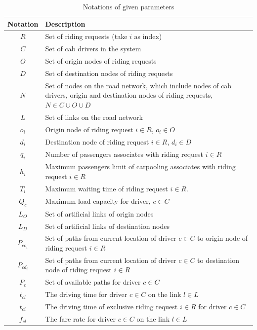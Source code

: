 \renewcommand\arraystretch{1.0}
\par
\begin{longtable}{cp{14cm}}
  \caption{Notations of given parameters}\\
  \toprule
  \multicolumn{1}{l}{Notation}&
  \multicolumn{1}{l}{Description}\\
  \midrule
  \endhead
    $R$ & Set of riding requests (take $i$ as index) \\
    $C$ & Set of cab drivers in the system \\
    $O$ & Set of origin nodes of riding requests \\
    $D$ & Set of destination nodes of riding requests \\
    $N$ & Set of nodes on the road network, which include nodes of cab drivers, origin and destination nodes of riding requests, $N \in C \cup O \cup D$ \\
    $L$ & Set of links on the road network \\
    $o_i$ & Origin node of riding request $i \in R$, $o_i \in O$ \\
    $d_i$ & Destination node of riding request $i \in R$, $d_i \in D$ \\
    $q_i$ & Number of passengers associates with riding request $i \in R$ \\
    $h_i$ & Maximum passengers limit of carpooling associates with riding request $i \in R$ \\
    $T_i$ & Maximum waiting time of riding request $i \in R$. \\
    $Q_c$ & Maximum load capacity for driver, $c \in C$ \\
    $L_{O}$ & Set of artificial links of origin nodes \\
    $L_{D}$ & Set of artificial links of destination nodes \\
    $P_{co_i}$ & Set of paths from current location of driver $c \in C$ to origin node of riding request $i \in R$ \\
    $P_{cd_i}$ & Set of paths from current location of driver $c \in C$ to destination node of riding request $i \in R$ \\
    $P_c$ & Set of available paths for driver $c \in C$  \\
    $t_{cl}$ & The driving time for driver $c \in C$ on the link $l \in L$ \\
    $t_{ci}$ & The driving time of exclusive riding request $i \in R$ for driver $c \in C$ \\
    $f_{cl}$ & The fare rate for driver $c \in C$ on the link $l \in L$ \\

\end{longtable}
